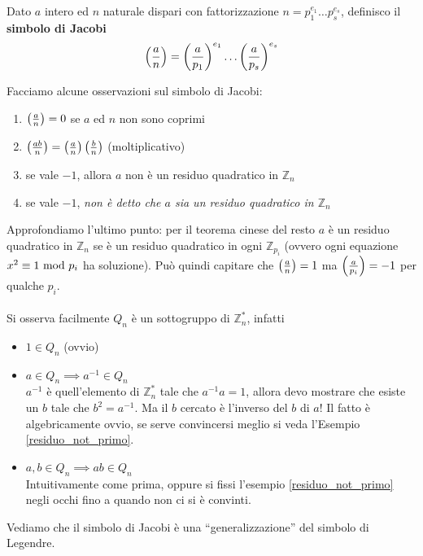\begin{definizione}
	Dato $a$ intero ed $n$ naturale dispari con fattorizzazione $n=p_1^{e_1}\dots p_s^{e_s}$, definisco il \textbf{simbolo di Jacobi}
	\begin{equation*}
	\left(\frac{a}{n}\right)=\left(\frac{a}{p_1}\right)^{e_1}\dots\left(\frac{a}{p_s}\right)^{e_s}
	\end{equation*}
\end{definizione}
\begin{osservazione}
	Facciamo alcune osservazioni sul simbolo di Jacobi:
	\begin{enumerate}
		\item $\left(\frac{a}{n}\right)=0$ se $a$ ed $n$ non sono coprimi
		\item $\left(\frac{ab}{n}\right)=\left(\frac{a}{n}\right)\left(\frac{b}{n}\right)$ (moltiplicativo)
		\item se vale $-1$, allora $a$ non è un residuo quadratico in $\mathbb{Z}_n$
		\item se vale $-1$, \textit{non è detto che $a$ sia un residuo quadratico in $\mathbb{Z}_n$}
	\end{enumerate}
	Approfondiamo l'ultimo punto: per il teorema cinese del resto $a$ è un residuo quadratico in $\mathbb{Z}_n$ se è un residuo quadratico in ogni $\mathbb{Z}_{p_i}$ (ovvero ogni equazione $x^2\equiv1\ \mathrm{mod}\ p_i$ ha soluzione). Può quindi capitare che $\left(\frac{a}{n}\right)=1$ ma $\left(\frac{a}{p_i}\right)=-1$ per qualche $p_i$. \\ \\ Si osserva facilmente $Q_n$ è un sottogruppo di $\mathbb{Z}_n^*$, infatti
	\begin{itemize}
		\item $1\in Q_n$ (ovvio)
		\item $a\in Q_n \implies a^{-1}\in Q_n$ \\ $a^{-1}$ è quell'elemento di $\mathbb{Z}_n^*$ tale che $a^{-1}a=1$, allora devo mostrare che esiste un $b$ tale che $b^2=a^{-1}$. Ma il $b$ cercato è l'inverso del $b$ di $a$! Il fatto è algebricamente ovvio, se serve convincersi meglio si veda l'Esempio \ref{residuo_not_primo}.
		\item $a,b\in Q_n \implies ab\in Q_n$ \\ Intuitivamente come prima, oppure si fissi l'esempio \ref{residuo_not_primo} negli occhi fino a quando non ci si è convinti.
	\end{itemize}
Vediamo che il simbolo di Jacobi è una \enquote{generalizzazione} del simbolo di Legendre.
\end{osservazione}

